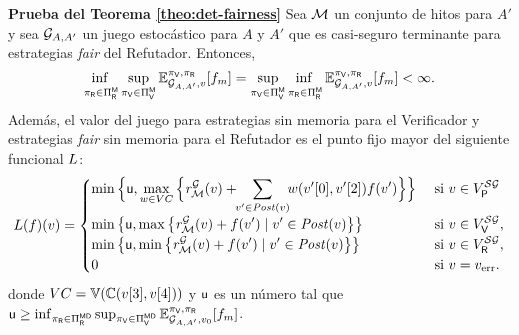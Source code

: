 \noindent
\textbf{Prueba del Teorema \ref{theo:det-fairness}}
Sea $\milestones$ un conjunto de hitos para $A'$ y sea  $\StochG_{A,A'}$ un juego estocástico para $A$ y $A'$ que es casi-seguro 
terminante para estrategias \emph{fair} del Refutador.  Entonces,  
\[\adjustlimits
 \inf_{\strat{\Refuter} \in \Strategies{\Refuter}^{\Memoryless}} \sup_{\strat{\Verifier} \in \Strategies{\Verifier}^{\Memoryless}}  \mathbb{E}^{\strat{\Verifier},\strat{\Refuter}}_{\StochG_{A,A'}, v}[\FMask] 
    = 
    \adjustlimits    
    \sup_{\strat{\Verifier} \in \Strategies{\Verifier}^{\Memoryless}} \inf_{\strat{\Refuter} \in \Strategies{\Refuter}^{\Memoryless}}    \mathbb{E}^{\strat{\Verifier},\strat{\Refuter}}_{\StochG_{A,A'}, v}[\FMask] 
    < \infty.
\]
Además, 
el valor del juego para estrategias sin memoria para el Verificador y estrategias \emph{fair} sin memoria para el Refutador es el punto fijo mayor del siguiente funcional  $\Bellman$: 
%
{\small
\[
    \Bellman(f)(v) =
    \begin{cases}
           \displaystyle \min \Big\{\upperbound,  \max_{w \in VC} \Big\{ \mreward^\StochG(v)  +\!\! \sum_{v' \in \post(v)}\!\! w(\pr{0}{v'},\pr{2}{v'})  f(v') \Big\} \Big\}& \text{ si }v \in V^{\SymbG}_\Probabilistic  \\
           \displaystyle \min \big\{ \upperbound, \max \big\{\mreward^\StochG(v)  + f(v') \mid v' \in \post(v) \big\} \big\} & \text{ si } v \in  V^{\SymbG}_\Verifier, \\
           \displaystyle \min \big\{ \upperbound,  \min \big\{\mreward^\StochG(v)  + f(v') \mid v' \in \post(v) \big\} \big\} & \text{ si } v \in  V^{\SymbG}_\Refuter, \\
           \displaystyle 0 & \text{ si } v=\ErrorSt.
           \displaystyle 
    \end{cases}
\]}%
donde $VC=\vertices{\couplings{\pr{3}{v}}{\pr{4}{v}}}$ y $\upperbound$ es un número tal que
$\upperbound \geq \inf_{\strat{\Refuter} \in \Strategies{\Refuter}^{\Memoryless\Deterministic}} \sup_{\strat{\Verifier} \in \Strategies{\Verifier}^{\Memoryless\Deterministic}} \Expect{\strat{\Verifier}}{\strat{\Refuter}}_{\StochG_{A,A'}, \InitVertex}[\FMask]$.
\noindent \\

